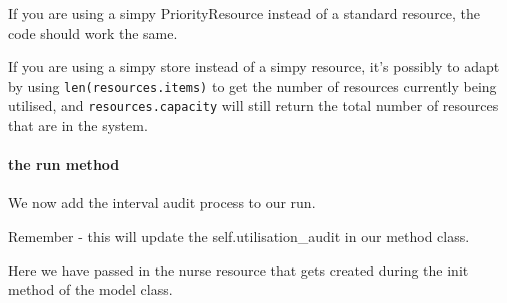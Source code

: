 \documentclass[
  letterpaper,
  DIV=11,
  numbers=noendperiod]{scrreprt}
\let\oldparagraph\paragraph
\renewcommand{\paragraph}[1]{\oldparagraph{#1}\mbox{}}
\begin{document}
\begin{tcolorbox}[enhanced jigsaw, rightrule=.15mm, colback=white, colframe=quarto-callout-tip-color-frame, colbacktitle=quarto-callout-tip-color!10!white, toprule=.15mm, coltitle=black, opacityback=0, titlerule=0mm, bottomtitle=1mm, breakable, title=\textcolor{quarto-callout-tip-color}{\faLightbulb}\hspace{0.5em}{Tip}, opacitybacktitle=0.6, toptitle=1mm, arc=.35mm, bottomrule=.15mm, leftrule=.75mm, left=2mm]

If you are using a simpy PriorityResource instead of a standard
resource, the code should work the same.

If you are using a simpy store instead of a simpy resource, it's
possibly to adapt by using \texttt{len(resources.items)} to get the
number of resources currently being utilised, and
\texttt{resources.capacity} will still return the total number of
resources that are in the system.

\end{tcolorbox}

\paragraph{the run method}\label{the-run-method-5}

We now add the interval audit process to our run.

Remember - this will update the self.utilisation\_audit in our method
class.

Here we have passed in the nurse resource that gets created during the
init method of the model class.
\end{document}
